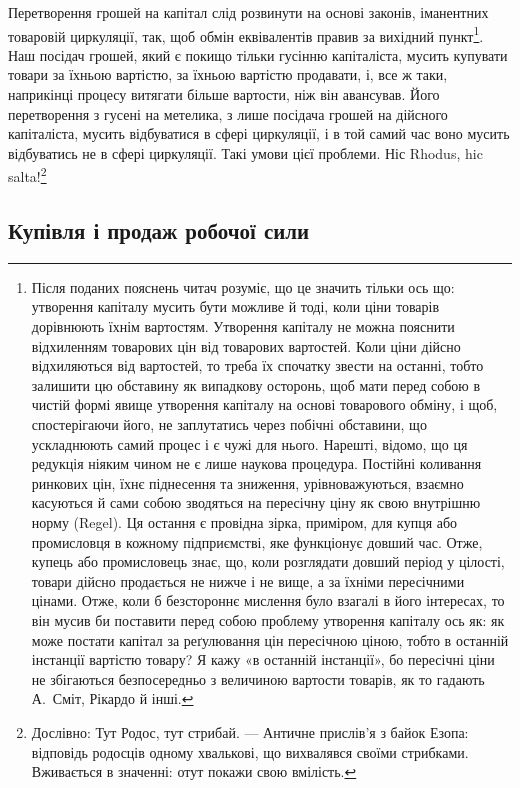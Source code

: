 Перетворення грошей на капітал слід розвинути на основі
законів, іманентних товаровій циркуляції, так, щоб обмін еквівалентів
правив за вихідний пункт\footnote{
Після поданих пояснень читач розуміє, що це значить тільки ось
що: утворення капіталу мусить бути можливе й тоді, коли ціни товарів
дорівнюють їхнім вартостям. Утворення капіталу не можна пояснити відхиленням
товарових цін від товарових вартостей. Коли ціни дійсно
відхиляються від вартостей, то треба їх спочатку звести на останні, тобто
залишити цю обставину як випадкову осторонь, щоб мати перед собою в
чистій формі явище утворення капіталу на основі товарового обміну, і
щоб, спостерігаючи його, не заплутатись через побічні обставини, що
ускладнюють самий процес і є чужі для нього. Нарешті, відомо, що ця
редукція ніяким чином не є лише наукова процедура. Постійні коливання
ринкових цін, їхнє піднесення та зниження, урівноважуються,
взаємно
касуються й сами собою зводяться на пересічну ціну як свою внутрішню
норму (Regel). Ця остання є провідна зірка, приміром, для купця або
промисловця в кожному підприємстві, яке функціонує довший час. Отже,
купець або промисловець знає, що, коли розглядати довший період у
цілості, товари дійсно продається не нижче і не вище, а за їхніми пересічними
цінами. Отже, коли б безстороннє мислення було взагалі в його інтересах,
то він мусив би поставити перед собою проблему утворення капіталу
ось як: як може постати капітал за реґулювання цін пересічною ціною,
тобто в останній інстанції вартістю товару? Я кажу «в останній інстанції»,
бо пересічні ціни не збігаються безпосередньо з величиною вартости товарів,
як то гадають А.~Сміт, Рікардо й інші.
}. Наш посідач грошей, який
є покищо тільки гусінню капіталіста, мусить купувати товари
за їхньою вартістю, за їхньою вартістю продавати, і, все ж таки,
наприкінці процесу витягати більше вартости, ніж він авансував.
Його перетворення з гусені на метелика, з лише посідача
грошей на дійсного капіталіста, мусить відбуватися в сфері
циркуляції, і в той самий час воно мусить відбуватись не
в сфері циркуляції. Такі умови цієї проблеми. Ніс Rhodus,
hic salta!\footnote*{
Дослівно: Тут Родос, тут стрибай. — Античне прислів’я з байок
Езопа: відповідь родосців одному хвалькові, що вихвалявся своїми
стрибками. Вживається в значенні: отут покажи свою вмілість. 
}

\subsection{Купівля і продаж робочої сили}

